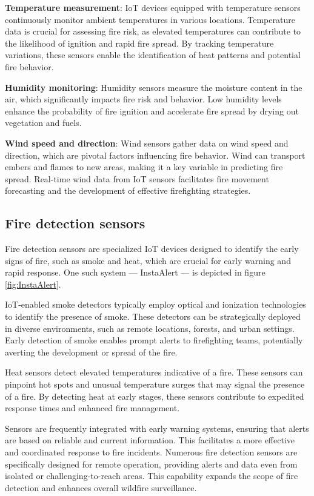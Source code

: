 \documentclass[
  12 pt,
]{Nemilov}
\begin{document}
\textbf{Temperature measurement}: IoT devices equipped with temperature sensors continuously monitor ambient temperatures in various locations. Temperature data is crucial for assessing fire risk, as elevated temperatures can contribute to the likelihood of ignition and rapid fire spread. By tracking temperature variations, these sensors enable the identification of heat patterns and potential fire behavior.

\textbf{Humidity monitoring}: Humidity sensors measure the moisture content in the air, which significantly impacts fire risk and behavior. Low humidity levels enhance the probability of fire ignition and accelerate fire spread by drying out vegetation and fuels.

\textbf{Wind speed and direction}: Wind sensors gather data on wind speed and direction, which are pivotal factors influencing fire behavior. Wind can transport embers and flames to new areas, making it a key variable in predicting fire spread. Real-time wind data from IoT sensors facilitates fire movement forecasting and the development of effective firefighting strategies.

\subsection{Fire detection sensors}\label{fire-detection-sensors}

Fire detection sensors are specialized IoT devices designed to identify the early signs of fire, such as smoke and heat, which are crucial for early warning and rapid response. One such system --- InstaAlert --- is depicted in figure \ref{fig:InstaAlert}.

IoT-enabled smoke detectors typically employ optical and ionization technologies to identify the presence of smoke. These detectors can be strategically deployed in diverse environments, such as remote locations, forests, and urban settings. Early detection of smoke enables prompt alerts to firefighting teams, potentially averting the development or spread of the fire.

Heat sensors detect elevated temperatures indicative of a fire. These sensors can pinpoint hot spots and unusual temperature surges that may signal the presence of a fire. By detecting heat at early stages, these sensors contribute to expedited response times and enhanced fire management.

Sensors are frequently integrated with early warning systems, ensuring that alerts are based on reliable and current information. This facilitates a more effective and coordinated response to fire incidents. Numerous fire detection sensors are specifically designed for remote operation, providing alerts and data even from isolated or challenging-to-reach areas. This capability expands the scope of fire detection and enhances overall wildfire surveillance.
\end{document}
